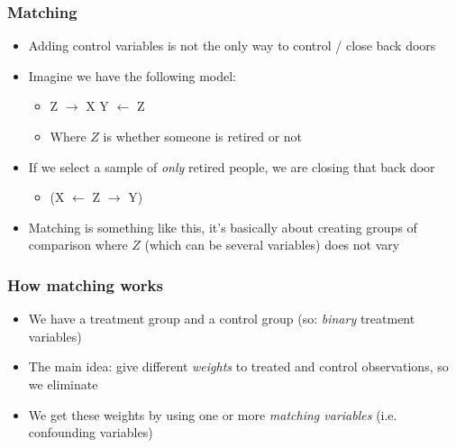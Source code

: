 \documentclass[aspectratio=43]{beamer}
\begin{document}
\begin{frame}
\frametitle{Matching}
\centering

\begin{itemize}
  \item Adding control variables is not the only way to control / close back doors
  \item Imagine we have the following model:
  \begin{itemize}
    \item Z $\rightarrow$ X {\color{red}{$\rightarrow$}} Y $\leftarrow$ Z
    \item Where $Z$ is whether someone is retired or not
  \end{itemize}
  \item If we select a sample of \textit{only} retired people, we are closing that back door
  \begin{itemize}
    \item (X $\leftarrow$ Z $\rightarrow$ Y)
  \end{itemize}
  \item Matching is something like this, it's basically about creating groups of comparison where $Z$ (which can be several variables) does not vary
\end{itemize}

\end{frame}

\begin{frame}
\frametitle{How matching works}
\centering

\begin{itemize}
  \item We have a treatment group and a control group (so: \textit{binary} treatment variables)
  \item The main idea: give different \textit{weights} to treated and control observations, so we eliminate
  \item We get these weights by using one or more \textit{matching variables} (i.e. confounding variables)
\end{itemize}

\end{frame}
\end{document}
